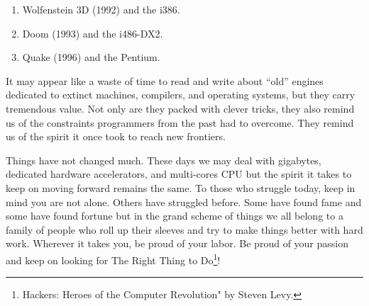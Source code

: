 \documentclass[book.tex]{subfiles}
\begin{document}
\begin{enumerate}
\item Wolfenstein 3D (1992) and the i386.
\item Doom (1993) and the i486-DX2.
\item Quake (1996) and the Pentium.
\end{enumerate}

\bigskip

It may appear like a waste of time to read and write about ``old'' engines dedicated to extinct machines, compilers, and operating systems, but they carry tremendous value. Not only are they packed with clever tricks, they also remind us of the constraints programmers from the past had to overcome. They remind us of the spirit it once took to reach new frontiers.\\
\par
Things have not changed much. These days we may deal with gigabytes, dedicated hardware accelerators, and multi-cores CPU but the spirit it takes to keep on moving forward remains the same. To those who struggle today, keep in mind you are not alone. Others have struggled before. Some have found fame and some have found fortune but in the grand scheme of things we all belong to a family of people who roll up their sleeves and try to make things better with hard work. Wherever it takes you, be proud of your labor. Be proud of your passion and keep on looking for The Right Thing to Do\footnote{Hackers: Heroes of the Computer Revolution" by Steven Levy.}!\\
\end{document}
